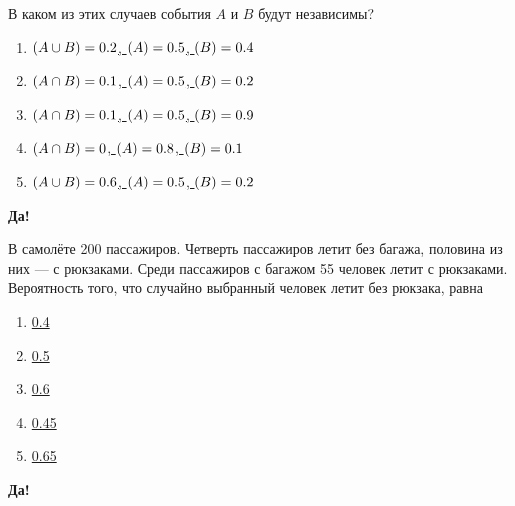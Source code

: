 \documentclass[t]{beamer}
\let\P\relax
\DeclareMathOperator{\P}{\mathbb{P}}
\begin{document}
 \begin{frame} \label{12-Yes} 
\begin{block}{12} 

В каком из этих случаев события $A$ и $B$ будут независимы?


 \end{block} 
\begin{enumerate} 
\item[] \hyperlink{12-No}{\beamergotobutton{}  $\P(A \cup B) = 0.2$, $\P (A) = 0.5$, $\P(B) = 0.4$ }
\item[] \hyperlink{12-Yes}{\beamergotobutton{}  $\P(A \cap B) = 0.1$, $\P (A) = 0.5$, $\P(B) = 0.2$ }
\item[] \hyperlink{12-No}{\beamergotobutton{}  $\P(A \cap B) = 0.1$, $\P (A) = 0.5$, $\P(B) = 0.9$ }
\item[] \hyperlink{12-No}{\beamergotobutton{}  $\P(A \cap B) = 0$, $\P (A) = 0.8$, $\P(B) = 0.1$ }
\item[] \hyperlink{12-No}{\beamergotobutton{}  $\P(A \cup B) = 0.6$, $\P (A) = 0.5$, $\P(B) = 0.2$ }
\end{enumerate} 

 \textbf{Да!} 
 \hyperlink{13}{}\end{frame} 


 \begin{frame} \label{13-Yes} 
\begin{block}{13} 

В самолёте 200 пассажиров. Четверть пассажиров летит без багажа, половина из них — с рюкзаками. Среди пассажиров с багажом 55 человек летит с рюкзаками. Вероятность того, что случайно выбранный человек летит без рюкзака, равна

  


 \end{block} 
\begin{enumerate} 
\item[] \hyperlink{13-No}{\beamergotobutton{}  0.4 }
\item[] \hyperlink{13-No}{\beamergotobutton{}  0.5 }
\item[] \hyperlink{13-Yes}{\beamergotobutton{}  0.6 }
\item[] \hyperlink{13-No}{\beamergotobutton{}  0.45 }
\item[] \hyperlink{13-No}{\beamergotobutton{}  0.65 }
\end{enumerate} 

 \textbf{Да!} 
 \hyperlink{14}{}\end{frame} 
\end{document}
